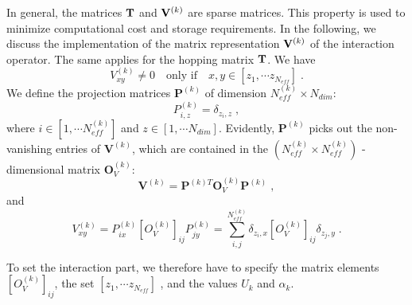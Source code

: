 In general, the matrices ${\bf T}$ and ${\bf V}^{(k)}$ are sparse matrices. 
This property is used to minimize computational cost and storage requirements.
In the following, we discuss the implementation of the matrix representation ${\bf V}^{(k)}$ of the interaction operator. 
The same applies for the hopping matrix ${\bf T}$.
We have
\begin{equation}
V^{(k)}_{x y}\neq 0\quad \text{only if} \quad x,y \in [z_{1},\cdots  z_{N_{eff}}]\;.
\end{equation}
We define the projection matrices $\mathbf{P}^{(k)}$ of dimension $N_{eff}^{(k)}\times N_{dim}$:
\begin{equation}
P^{(k)}_{i,z}=\delta_{z_{i},z}\;,
\end{equation}
where $i\in [1,\cdots N_{eff}^{(k)}]$ and $z\in [1,\cdots N_{dim}]$. Evidently, $\bm{P}^{(k)}$ picks out the non-vanishing entries of $\bm{V}^{(k)}$, 
which are contained in the $(N_{eff}^{(k)}\times N_{eff}^{(k)})$ - dimensional matrix $\bm{O}_{V}^{(k)}$:
\begin{equation}
\bm{V}^{(k)}=\bm{P}^{(k) T} \bm{O}_{V}^{(k)}\bm{P}^{(k)}\;,
\end{equation}
and
\begin{equation}
V_{xy}^{(k)}=P^{(k)}_{ix} \left[O_{V}^{(k)}\right]_{ij}P_{jy}^{(k)}=\sum\limits_{i,j}^{N_{eff}^{(k)}} \delta_{z_{i},x}  \left[O_{V}^{(k)}\right]_{ij} \delta_{z_{j},y} \;.
\end{equation}

To set the interaction part, we therefore have to specify the matrix elements $\left[O_{V}^{(k)}\right]_{ij}$, the set $[z_{1},\cdots  z_{N_{eff}}]$ , and the values $U_{k}$ and $\alpha_{k}$.